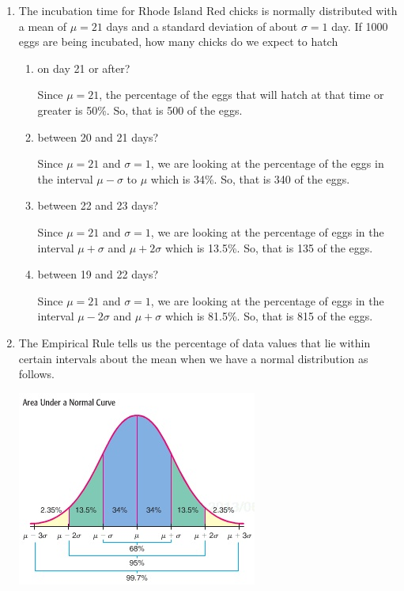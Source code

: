 \documentclass{article}
\newcommand{\answer}[1]{\color{red}#1}
\begin{document}
\begin{enumerate}
\begin{enumerate}
	\end{enumerate}
	
\item The incubation time for Rhode Island Red chicks is normally distributed with a mean of $\mu = 21$ days and a standard deviation of about $\sigma =1$ day.  If 1000 eggs are being incubated, how many chicks do we expect to hatch
	\begin{enumerate}
	\item on day 21 or after?
	
	{\answer Since $\mu = 21$, the percentage of the eggs that will hatch at that time or greater is 50\%.  So, that is 500 of the eggs.}
	
	\item between 20 and 21 days? 
	
	{\answer Since $\mu = 21$ and $\sigma =1$, we are looking at the percentage of the eggs in the interval $\mu-\sigma$ to $\mu$ which is 34\%.  So, that is 340 of the eggs.}
	
	\item between 22 and 23 days?
	
	{\answer Since $\mu = 21$ and $\sigma=1$, we are looking at the percentage of eggs in the interval $\mu+\sigma$ and $\mu + 2\sigma$ which is 13.5\%.  So, that is 135 of the eggs.}
	
	\item between 19 and 22 days?
	
	{\answer Since $\mu = 21$ and $\sigma=1$, we are looking at the percentage of eggs in the interval $\mu-2\sigma$ and $\mu + \sigma$ which is 81.5\%.  So, that is 815 of the eggs.}
	
	\end{enumerate}

\newpage

\item The Empirical Rule tells us the percentage of data values that lie within certain intervals about the mean when we have a normal distribution as follows.

\begin{center}
\includegraphics[scale=0.5]{WS10_NormalArea.jpg}
\end{center}


\end{enumerate}
\end{document}
